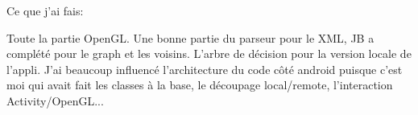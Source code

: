 Ce que j'ai fais:

Toute la partie OpenGL.
Une bonne partie du parseur pour le XML, JB a complété pour le graph et les voisins.
L'arbre de décision pour la version locale de l'appli.
J'ai beaucoup influencé l'architecture du code côté android puisque c'est moi qui avait fait les classes à la base, le découpage local/remote, l'interaction Activity/OpenGL...